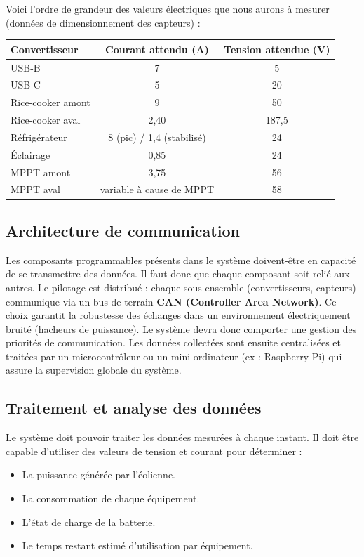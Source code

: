 Voici l'ordre de grandeur des valeurs électriques que nous aurons à mesurer (données de dimensionnement des capteurs) : 

\begin{tableau}[H]
    \centering
    \begin{tabularx}{\textwidth}{X c c}
        \toprule
        \textbf{Convertisseur} & \textbf{Courant attendu (A)} & \textbf{Tension attendue (V)} \\
        \midrule
        USB-B & 7 & 5 \\
        USB-C & 5 & 20 \\
        Rice-cooker amont & 9 & 50 \\
        Rice-cooker aval & 2,40 & 187,5 \\
        Réfrigérateur & 8 (pic) / 1,4 (stabilisé) & 24 \\
        Éclairage & 0,85 & 24 \\
        MPPT amont & 3,75 & 56 \\
        MPPT aval & variable à cause de MPPT & 58 \\
        \bottomrule
    \end{tabularx}
    \caption{Ordres de grandeur des mesures pour le monitoring}
    \label{tab:monitoring_values_detailed}
\end{tableau}

\subsection{Architecture de communication}
Les composants programmables présents dans le système doivent-être en capacité de se transmettre des données. Il faut donc que chaque composant soit relié aux autres. Le pilotage est distribué : chaque sous-ensemble (convertisseurs, capteurs) communique via un bus de terrain \textbf{CAN (Controller Area Network)}. Ce choix garantit la robustesse des échanges dans un environnement électriquement bruité (hacheurs de puissance). Le système devra donc comporter une gestion des priorités de communication. Les données collectées sont ensuite centralisées et traitées par un microcontrôleur ou un mini-ordinateur (ex : Raspberry Pi) qui assure la supervision globale du système.

\subsection{Traitement et analyse des données}
Le système doit pouvoir traiter les données mesurées à chaque instant. Il doit être capable d’utiliser des valeurs de tension et courant pour déterminer : 
\begin{itemize}
    \item La puissance générée par l’éolienne.
    \item La consommation de chaque équipement.
    \item L’état de charge de la batterie.
    \item Le temps restant estimé d’utilisation par équipement.
\end{itemize}

